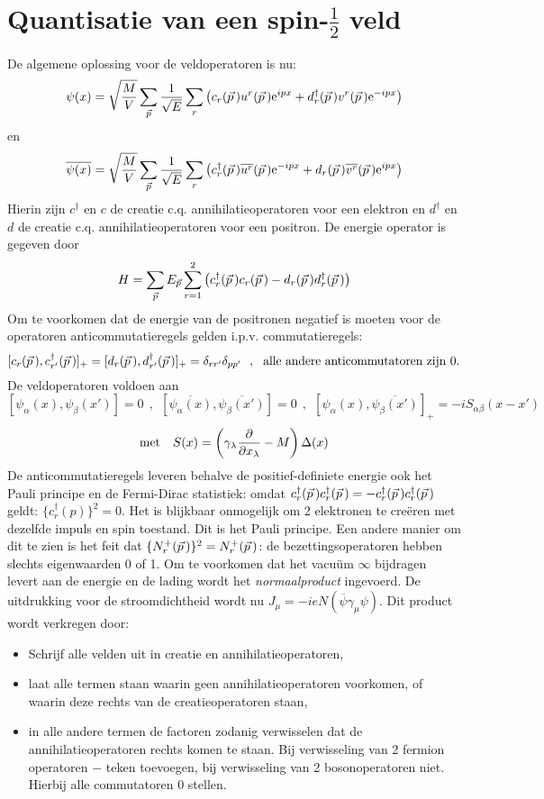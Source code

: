 \section[~~Quantisatie van een spin-$\frac{1}{2}$ veld]{Quantisatie van een spin-$\frac{1}{2}$ veld}
De algemene oplossing voor de veldoperatoren is nu:
\[
\psi(x)=\sqrt{\frac{M}{V}}\sum_{\vec{p}}\frac{1}{\sqrt{E}}\sum_r
\left(c_r(\vec{p}\,)u^r(\vec{p}\,){\rm e}^{ipx}+
d^\dagger_r(\vec{p}\,)v^r(\vec{p}\,){\rm e}^{-ipx}\right)
\]
en
\[
\overline{\psi(x)}=\sqrt{\frac{M}{V}}\sum_{\vec{p}}\frac{1}{\sqrt{E}}\sum_r
\left(c^\dagger_r(\vec{p}\,)\overline{u^r}(\vec{p}\,){\rm e}^{-ipx}+
d_r(\vec{p}\,)\overline{v^r}(\vec{p}\,){\rm e}^{ipx}\right)
\]
Hierin zijn $c^\dagger$ en $c$ de creatie c.q. annihilatieoperatoren voor een
elektron en $d^\dagger$ en $d$ de creatie c.q. annihilatieoperatoren voor een
positron. De energie operator is gegeven door
\[
H=\sum_{\vec{p}}E_{\vec{p}}\sum_{r=1}^2\left(c_r^\dagger(\vec{p}\,)c_r(\vec{p}\,)-d_r(\vec{p}\,)d^\dagger_r(\vec{p}\,)\right)
\]
Om te voorkomen dat de energie van de positronen negatief is moeten voor de
operatoren anticommutatieregels gelden i.p.v. commutatieregels:
\[
[c_r(\vec{p}\,),c_{r'}^\dagger(\vec{p}\,)]_+=[d_r(\vec{p}\,),d_{r'}^\dagger(\vec{p}\,)]_+=\delta_{rr'}\delta_{pp'}~~,~~
\mbox{alle andere anticommutatoren zijn 0.}
\]
De veldoperatoren voldoen aan
\[
[\psi_\alpha(x),\psi_\beta(x')]=0~~,~~
[\overline{\psi_\alpha(x)},\overline{\psi_\beta(x')}]=0~~,~~
[\psi_\alpha(x),\overline{\psi_\beta(x')}]_+=-iS_{\alpha\beta}(x-x')
\]
\[
\mbox{met}~~~S(x)=\left(\gamma_\lambda\frac{\partial }{\partial x_\lambda}-M\right)\Delta(x)
\]
De anticommutatieregels leveren behalve de positief-definiete energie ook het
Pauli principe en de Fermi-Dirac statistiek: omdat
$c_r^\dagger(\vec{p}\,)c_r^\dagger(\vec{p}\,)=-c_r^\dagger(\vec{p}\,)c_r^\dagger(\vec{p}\,)$
geldt: $\{c_r^\dagger(p)\}^2=0$. Het is blijkbaar onmogelijk om 2 elektronen
te cre\"eren met dezelfde impuls en spin toestand. Dit is het Pauli principe.
Een andere manier om dit te zien is het feit dat
$\{N_r^+(\vec{p}\,)\}^2=N_r^+(\vec{p}\,)$: de bezettingsoperatoren hebben slechts
eigenwaarden 0 of 1.
\npar
Om te voorkomen dat het vacu\"um $\infty$ bijdragen levert aan de energie en
de lading wordt het {\it normaalproduct} ingevoerd. De uitdrukking voor de
stroomdichtheid wordt nu $J_\mu=-ieN(\overline{\psi}\gamma_\mu\psi)$. Dit
product wordt verkregen door:
\begin{itemize}
\item Schrijf alle velden uit in creatie en annihilatieoperatoren,
\item laat alle termen staan waarin geen annihilatieoperatoren voorkomen, of
      waarin deze rechts van de creatieoperatoren staan,
\item in alle andere termen de factoren zodanig verwisselen dat de
      annihilatieoperatoren rechts komen te staan. Bij verwisseling van 2
      fermion operatoren $-$ teken toevoegen, bij verwisseling van 2
      bosonoperatoren niet. Hierbij alle commutatoren 0 stellen.
\end{itemize}

